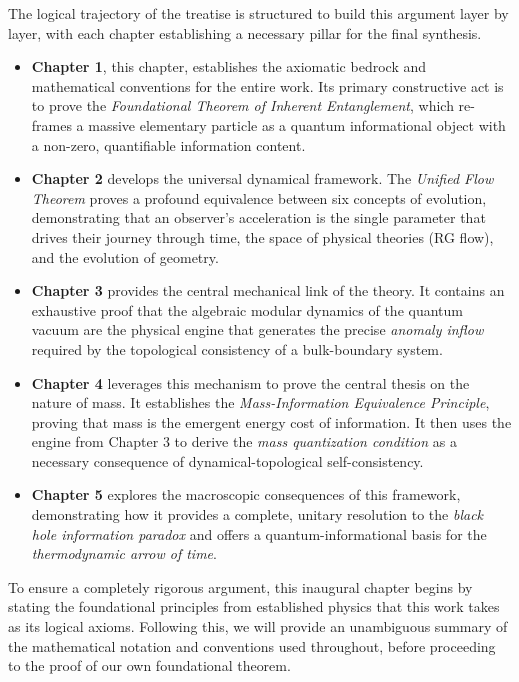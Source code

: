 \documentclass[11pt, letterpaper]{report}
\theoremstyle{plain} %
\theoremstyle{definition} %
\theoremstyle{remark} %
\begin{document}
The logical trajectory of the treatise is structured to build this argument layer by layer, with each chapter establishing a necessary pillar for the final synthesis.
\begin{itemize}
    \item \textbf{Chapter 1}, this chapter, establishes the axiomatic bedrock and mathematical conventions for the entire work. Its primary constructive act is to prove the \textit{Foundational Theorem of Inherent Entanglement}, which re-frames a massive elementary particle as a quantum informational object with a non-zero, quantifiable information content.

    \item \textbf{Chapter 2} develops the universal dynamical framework. The \textit{Unified Flow Theorem} proves a profound equivalence between six concepts of evolution, demonstrating that an observer's acceleration is the single parameter that drives their journey through time, the space of physical theories (RG flow), and the evolution of geometry.

    \item \textbf{Chapter 3} provides the central mechanical link of the theory. It contains an exhaustive proof that the algebraic modular dynamics of the quantum vacuum are the physical engine that generates the precise \textit{anomaly inflow} required by the topological consistency of a bulk-boundary system.

    \item \textbf{Chapter 4} leverages this mechanism to prove the central thesis on the nature of mass. It establishes the \textit{Mass-Information Equivalence Principle}, proving that mass is the emergent energy cost of information. It then uses the engine from Chapter 3 to derive the \textit{mass quantization condition} as a necessary consequence of dynamical-topological self-consistency.

    \item \textbf{Chapter 5} explores the macroscopic consequences of this framework, demonstrating how it provides a complete, unitary resolution to the \textit{black hole information paradox} and offers a quantum-informational basis for the \textit{thermodynamic arrow of time}.
\end{itemize}

To ensure a completely rigorous argument, this inaugural chapter begins by stating the foundational principles from established physics that this work takes as its logical axioms. Following this, we will provide an unambiguous summary of the mathematical notation and conventions used throughout, before proceeding to the proof of our own foundational theorem.
\end{document}
